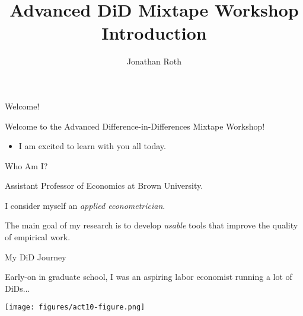 \documentclass[aspectratio = 169, 12pt]{beamer}
\author{Jonathan Roth}
\title[Advanced DiD Mixtape Workshop]{Advanced DiD Mixtape Workshop \\ Introduction}
\begin{document}

\begin{frame}{Welcome!}
  \addtocounter{framenumber}{-1}

  Welcome to the Advanced Difference-in-Differences Mixtape Workshop!

  \medskip
  \begin{itemize}
    \item I am excited to learn with you all today.
  \end{itemize}

\end{frame}


\begin{frame}{Who Am I?}
  \begin{wideitemize}

    \item
    Assistant Professor of Economics at Brown University.

    \item
    I consider myself an \textit{applied econometrician}.

    \item
    The main goal of my research is to develop \textit{usable} tools that improve the quality of empirical work.

  \end{wideitemize}
\end{frame}


\begin{frame}{My DiD Journey}

  \begin{wideitemize}
    \item
    Early-on in graduate school, I was an aspiring labor economist running a lot of DiDs...

  \end{wideitemize}
  \centering
  \texttt{[image: figures/act10-figure.png]}

\end{frame}
\end{document}
